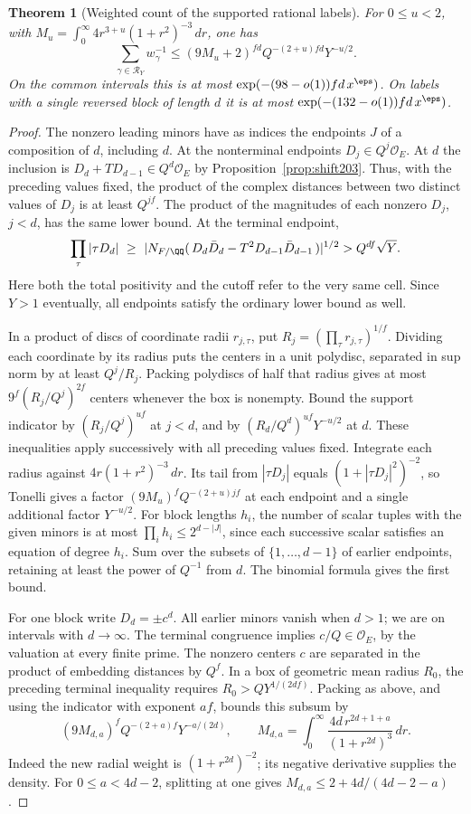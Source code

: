 \documentclass[a4paper,11pt]{article}
\newtheorem{theorem}[proposition]{Theorem}
\theoremstyle{definition}
\theoremstyle{remark}
\numberwithin{equation}{section}
\begin{document}
\begin{theorem}[Weighted count of the supported rational labels]
\leavevmode\label{thm:orbits235}
For \(0\le u<2\), with \(M_u=\int_0^\infty
4r^{3+u}(1+r^2)^{-3}\,dr\), one has
\[
 \sum_{\gamma\in\mathcal R_Y}w_\gamma^{-1}
 \le(9M_u+2)^{fd}Q^{-(2+u)fd}Y^{-u/2}.
\]
On the common intervals this is at most
\(\exp(-(98-o(1))fd\,x^\eps)\). On labels with a single
reversed block of length \(d\) it is at most
\(\exp(-(132-o(1))fd\,x^\eps)\).
\end{theorem}
\begin{proof}
The nonzero leading minors have as indices the endpoints \(J\)
of a composition of \(d\), including \(d\). At the nonterminal
endpoints \(D_j\in Q^j\mathcal O_E\). At \(d\) the inclusion is
\(D_d+TD_{d-1}\in Q^d\mathcal O_E\) by
Proposition~\ref{prop:shift203}. Thus, with the preceding
values fixed, the product of the complex distances between two
distinct values of \(D_j\) is at least \(Q^{jf}\). The product
of the magnitudes of each nonzero \(D_j\), \(j<d\), has the
same lower bound. At the terminal endpoint,
\[
 \prod_\tau|\tau D_d|\ \ge\
 |N_{F/\QQ}(\,D_d\bar D_d-T^2D_{d-1}\bar D_{d-1}\,)|^{1/2}
 >Q^{df}\sqrt Y .
\]
Here both the total positivity and the cutoff refer to the very
same cell. Since \(Y>1\) eventually, all endpoints satisfy the
ordinary lower bound as well.

In a product of discs of coordinate radii \(r_{j,\tau}\), put
\(R_j=(\prod_\tau r_{j,\tau})^{1/f}\). Dividing each coordinate
by its radius puts the centers in a unit polydisc, separated in
sup norm by at least \(Q^j/R_j\). Packing polydiscs of half
that radius gives at most \(9^f(R_j/Q^j)^{2f}\) centers whenever
the box is nonempty. Bound the support indicator by
\((R_j/Q^j)^{uf}\) at \(j<d\), and by
\((R_d/Q^d)^{uf}Y^{-u/2}\) at \(d\).
These inequalities apply successively with all preceding values fixed.
Integrate each radius against \(4r(1+r^2)^{-3}\,dr\). Its tail
from \(|\tau D_j|\) equals \((1+|\tau D_j|^2)^{-2}\), so
Tonelli gives a factor \((9M_u)^fQ^{-(2+u)jf}\) at each
endpoint and a single additional factor \(Y^{-u/2}\).
For block lengths \(h_i\), the number of scalar tuples with
the given minors is at most \(\prod_i h_i\le2^{d-|J|}\),
since each successive scalar satisfies an equation of degree
\(h_i\). Sum over the subsets of \(\{1,\ldots,d-1\}\) of
earlier endpoints, retaining at least the power of \(Q^{-1}\)
from \(d\). The binomial formula gives the first bound.

For one block write \(D_d=\pm c^d\). All earlier minors vanish
when \(d>1\); we are on intervals with \(d\to\infty\).
The terminal congruence implies \(c/Q\in\mathcal O_E\), by the
valuation at every finite prime. The nonzero centers \(c\) are
separated in the product of embedding distances by \(Q^f\).
In a box of geometric mean radius \(R_0\), the preceding
terminal inequality requires \(R_0>QY^{1/(2df)}\). Packing as
above, and using the indicator with exponent \(af\), bounds
this subsum by
\[
 (9M_{d,a})^f Q^{-(2+a)f}Y^{-a/(2d)},\qquad
 M_{d,a}=\int_0^\infty\frac{4d\,r^{2d+1+a}}{(1+r^{2d})^3}\,dr .
\]
Indeed the new radial weight is \((1+r^{2d})^{-2}\); its
negative derivative supplies the density. For \(0\le a<4d-2\),
splitting at one gives \(M_{d,a}\le2+4d/(4d-2-a)\).


\end{proof}
\end{document}
